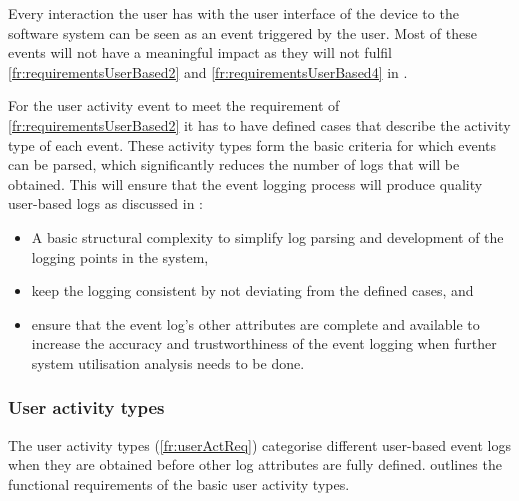 Every interaction the user has with the user interface of the device to the software system can be seen as an event triggered by the user. Most of these events will not have a meaningful impact as they will not fulfil \ref{fr:requirementsUserBased2} and \ref{fr:requirementsUserBased4} in .

\clearpage

For the user activity event to meet the requirement of \ref{fr:requirementsUserBased2} it has to have defined cases that describe the activity type of each event. These activity types form the basic criteria for which events can be parsed, which significantly reduces the number of logs that will be obtained. This will ensure that the event logging process will produce quality user-based logs as discussed in :

\begin{itemize}
	\item A basic structural complexity to simplify log parsing and development of the logging points in the system,
	\item keep the logging consistent by not deviating from the defined cases, and
	\item ensure that the event log's other attributes are complete and available to increase the accuracy and trustworthiness of the event logging when further system utilisation analysis needs to be done. 
\end{itemize}

\subsubsection{User activity types}\label{sec:ch2_userActivityTypes}
The user activity types (\ref{fr:userActReq}) categorise different user-based event logs when they are obtained before other log attributes are fully defined.  outlines the functional requirements of the basic user activity types.

